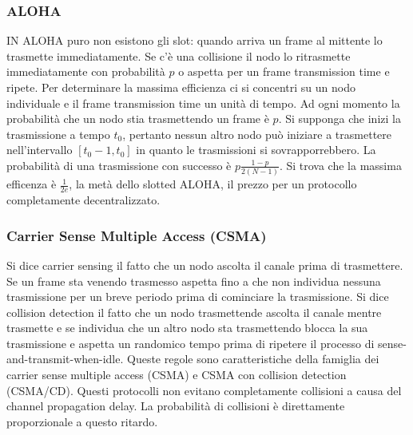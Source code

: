 \subsubsection{ALOHA}
IN ALOHA puro non esistono gli slot: quando arriva un frame al mittente lo trasmette immediatamente. Se c'\`e una collisione il nodo lo ritrasmette immediatamente con probabilit\`a $p$ o aspetta per un 
frame transmission time e ripete. Per determinare la massima efficienza ci si concentri su un nodo individuale e il frame transmission time un unit\`a di tempo. Ad ogni momento la probabilit\`a che un nodo 
stia trasmettendo un frame \`e $p$. Si supponga che inizi la trasmissione a tempo $t_0$, pertanto nessun altro nodo pu\`o iniziare a  trasmettere nell'intervallo $[t_0-1, t_0]$ in quanto le trasmissioni si 
sovrapporrebbero. La probabilit\`a di una trasmissione con successo \`e $p\frac{1-p}{2(N-1)}$. Si trova che la massima efficenza \`e $\frac{1}{2e}$, la met\`a dello slotted ALOHA, il prezzo per un protocollo
completamente decentralizzato. 
\subsubsection{Carrier Sense Multiple Access (CSMA)}
Si dice carrier sensing il fatto che un nodo ascolta il canale prima di trasmettere. Se un frame sta venendo trasmesso aspetta fino a che non individua nessuna trasmissione per un breve periodo prima di 
cominciare la trasmissione. Si dice collision detection il fatto che un nodo trasmettende ascolta il canale mentre trasmette e se individua che un altro nodo sta trasmettendo blocca la sua trasmissione e aspetta
un randomico tempo prima di ripetere il processo di sense-and-transmit-when-idle. Queste regole sono caratteristiche della famiglia dei carrier sense multiple access (CSMA) e CSMA con collision detection
(CSMA/CD). Questi protocolli non evitano completamente collisioni a causa del channel propagation delay. La probabilit\`a di collisioni \`e direttamente proporzionale a questo ritardo.
